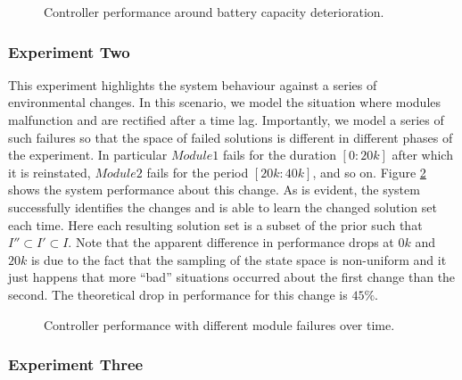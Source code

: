 \begin{figure}[ht]
\begin{center}

\end{center}
\caption{Controller performance around battery capacity deterioration.}
\label{fig:experiment1}
\end{figure}

\subsubsection{Experiment Two}

This experiment highlights the system behaviour against a series of environmental changes. In this scenario, we model the situation where modules malfunction and are rectified after a time lag. Importantly, we model a series of such failures so that the space of failed solutions is different in different phases of the experiment. In particular $Module1$ fails for the duration $[0:20k]$ after which it is reinstated, $Module2$ fails for the period $[20k:40k]$, and so on. Figure \ref{fig:experiment2} shows the system performance about this change. As is evident, the system successfully identifies the changes and is able to learn the changed solution set each time. Here each resulting solution set is a subset of the prior such that $I'' \subset I' \subset I$. Note that the apparent difference in performance drops at $0k$ and $20k$ is due to the fact that the sampling of the state space is non-uniform and it just happens that more ``bad'' situations occurred about the first change than the second. The theoretical drop in performance for this change is $45\%$. 

\begin{figure}[ht]
\begin{center}

\end{center}
\caption{Controller performance with different module failures over time.}
\label{fig:experiment2}
\end{figure}

\subsubsection{Experiment Three}

